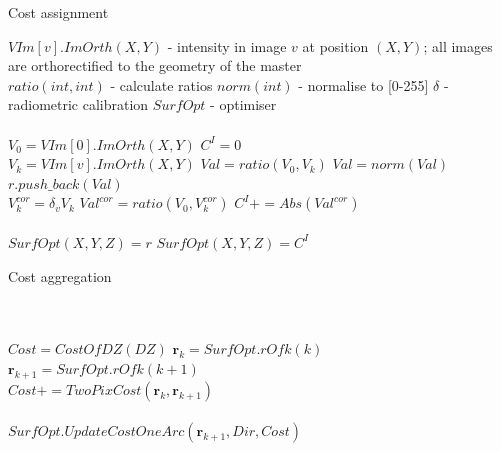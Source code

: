 \documentclass[journal]{IEEEtran}
\begin{document}
\begin{algorithm}
\caption{Cost assignment}
\begin{algorithmic}
\State  $VIm[v].ImOrth(X,Y)$ - intensity in image $v$ at position $(X,Y)$; all images are orthorectified to the geometry of the master\\
\State  $ratio(int,int)$ - calculate ratios
\State  $norm(int)$ - normalise to [0-255]
\State  $\delta$ - radiometric calibration
\State  $SurfOpt$ - optimiser\\

 \\

\State $V_0=VIm[0].ImOrth(X,Y)$
\State $C^I=0$
 \\
\State $V_k=VIm[v].ImOrth(X,Y)$
\State $Val=ratio(V_0,V_k)$
\State $Val=norm(Val)$
\State $r.push\_back( Val )$\\

\State $V_k^{cor} = \delta_v V_k$
\State $Val^{cor} = ratio(V_0,V_k^{cor})$
\State $C^I+=Abs(Val^{cor})$ 
\EndFor \\
\\
\State  $ SurfOpt(X,Y,Z) = r $
\State  $ SurfOpt(X,Y,Z) = C^I$ \\

\EndFor
\EndFor 
\EndFor  

\end{algorithmic}\label{alg:costPix}
\end{algorithm}
%
% 
\begin{algorithm*}
\caption{Cost aggregation}
\begin{algorithmic} 

  
 \\

 \\ 

\State $Cost = CostOfDZ(DZ)$ 
\State $\textbf{r}_{k} = SurfOpt.rOfk(k)$  
\State $\textbf{r}_{k+1} = SurfOpt.rOfk(k+1)$\\

\State $Cost += TwoPixCost(\textbf{r}_{k},\textbf{r}_{k+1})$\\
\\
\State $SurfOpt.UpdateCostOneArc(\textbf{r}_{k+1},Dir,Cost)$\\

 

\EndFor
\EndFor 
\EndFor 
\EndFor  
\EndFor

\end{algorithmic}\label{alg:costAggreg}
\end{algorithm*}
%
\end{document}
